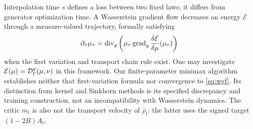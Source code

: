 Interpolation time $s$ defines a loss between two fixed laws; it differs from generator optimization time. A Wasserstein gradient flow decreases an energy $\mathcal E$ through a measure-valued trajectory, formally satisfying
\begin{equation}
\partial_\tau\mu_\tau
=\operatorname{div}_g\left(\mu_\tau\operatorname{grad}_g\frac{\delta\mathcal E}{\delta\mu}(\mu_\tau)\right)
\label{eq:wgf}
\end{equation}
when the first variation and transport chain rule exist. One may investigate $\mathcal E(\mu)=\mathcal D_\Gamma^g(\mu,\nu)$ in this framework. Our finite-parameter minimax algorithm establishes neither that first-variation formula nor convergence to \cref{eq:wgf}. Its distinction from kernel and Sinkhorn methods is its specified discrepancy and training construction, not an incompatibility with Wasserstein dynamics. The critic $m_t$ is also not the transport velocity of $\bar\rho_t$: the latter uses the signed target $(1-2B)A_t$.
